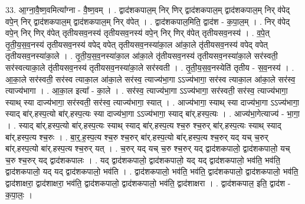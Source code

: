 \documentclass[17pt]{extarticle}
\begin{document}
33. आ॒ग्ना॒वै॒ष्ण॒वमित्या᳚ग्ना - वै॒ष्ण॒वम् । . द्वाद॑शकपाल॒म् निर् णिर् द्वाद॑शकपाल॒म् द्वाद॑शकपाल॒म् निर् व॑पेद् वपे॒न् निर् द्वाद॑शकपाल॒म् द्वाद॑शकपाल॒म् निर् व॑पेत् । . द्वाद॑शकपाल॒मिति॒ द्वाद॑श - क॒पा॒ल॒म् । . निर् व॑पेद् वपे॒न् निर् णिर् व॑पेत् तृतीयसव॒नस्य॑ तृतीयसव॒नस्य॑ वपे॒न् निर् णिर् व॑पेत् तृतीयसव॒नस्य॑ । . व॒पे॒त् तृ॒ती॒य॒स॒व॒नस्य॑ तृतीयसव॒नस्य॑ वपेद् वपेत् तृतीयसव॒नस्या॑का॒ल आ॑का॒ले तृ॑तीयसव॒नस्य॑ वपेद् वपेत् तृतीयसव॒नस्या॑का॒ले । . तृ॒ती॒य॒स॒व॒नस्या॑का॒ल आ॑का॒ले तृ॑तीयसव॒नस्य॑ तृतीयसव॒नस्या॑का॒ले सर॑स्वती॒ सर॑स्वत्याका॒ले तृ॑तीयसव॒नस्य॑ तृतीयसव॒नस्या॑का॒ले सर॑स्वती । . तृ॒ती॒य॒स॒व॒नस्येति॑ तृतीय - स॒व॒नस्य॑ । . आ॒का॒ले सर॑स्वती॒ सर॑स्व त्याका॒ल आ॑का॒ले सर॑स्व॒ त्याज्य॑भा॒गा ऽऽज्य॑भागा॒ सर॑स्व त्याका॒ल आ॑का॒ले सर॑स्व॒ त्याज्य॑भागा । . आ॒का॒ल इत्या᳚ - का॒ले । . सर॑स्व॒ त्याज्य॑भा॒गा ऽऽज्य॑भागा॒ सर॑स्वती॒ सर॑स्व॒ त्याज्य॑भागा॒ स्याथ् स्या दाज्य॑भागा॒ सर॑स्वती॒ सर॑स्व॒ त्याज्य॑भागा॒ स्यात् । . आज्य॑भागा॒ स्याथ् स्या दाज्य॑भा॒गा ऽऽज्य॑भागा॒ स्याद् बा॑र्.हस्प॒त्यो बा॑र्.हस्प॒त्यः स्या दाज्य॑भा॒गा ऽऽज्य॑भागा॒ स्याद् बा॑र्.हस्प॒त्यः । . आज्य॑भा॒गेत्याज्य॑ - भा॒गा॒ । . स्याद् बा॑र्.हस्प॒त्यो बा॑र्.हस्प॒त्यः स्याथ् स्याद् बा॑र्.हस्प॒त्य श्च॒रु श्च॒रुर् बा॑र्.हस्प॒त्यः स्याथ् स्याद् बा॑र्.हस्प॒त्य श्च॒रुः । . बा॒र्॒.ह॒स्प॒त्य श्च॒रु श्च॒रुर् बा॑र्.हस्प॒त्यो बा॑र्.हस्प॒त्य श्च॒रुर् यद् यच् च॒रुर् बा॑र्.हस्प॒त्यो बा॑र्.हस्प॒त्य श्च॒रुर् यत् । . च॒रुर् यद् यच् च॒रु श्च॒रुर् यद् द्वाद॑शकपालो॒ द्वाद॑शकपालो॒ यच् च॒रु श्च॒रुर् यद् द्वाद॑शकपालः । . यद् द्वाद॑शकपालो॒ द्वाद॑शकपालो॒ यद् यद् द्वाद॑शकपालो॒ भव॑ति॒ भव॑ति॒ द्वाद॑शकपालो॒ यद् यद् द्वाद॑शकपालो॒ भव॑ति । . द्वाद॑शकपालो॒ भव॑ति॒ भव॑ति॒ द्वाद॑शकपालो॒ द्वाद॑शकपालो॒ भव॑ति॒ द्वाद॑शाक्षरा॒ द्वाद॑शाक्षरा॒ भव॑ति॒ द्वाद॑शकपालो॒ द्वाद॑शकपालो॒ भव॑ति॒ द्वाद॑शाक्षरा । . द्वाद॑शकपाल॒ इति॒ द्वाद॑श - क॒पा॒लः॒ । \newline
\end{document}
